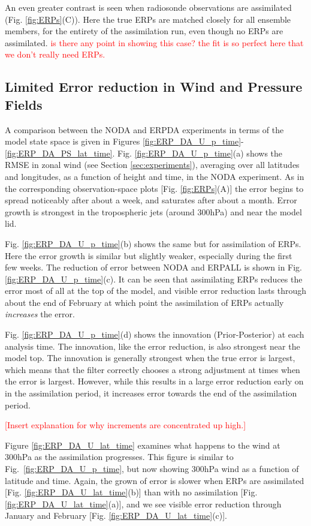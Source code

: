 \documentclass[draft,jgrga]{agutex}
\begin{document}
\begin{article}
An even greater contrast is seen when radiosonde observations are assimilated (Fig. \ref{fig:ERPs}(C)).
Here the true ERPs are matched closely for all ensemble members, for the entirety of the assimilation run, even though no ERPs are assimilated.
\textcolor{red}{is there any point in showing this case?  the fit is so perfect here that we don't really need ERPs.}

\subsection{Limited Error reduction in Wind and Pressure Fields}

A comparison between the NODA and ERPDA experiments in terms of the model state space is given in Figures \ref{fig:ERP_DA_U_p_time}-\ref{fig:ERP_DA_PS_lat_time}.
Fig. \ref{fig:ERP_DA_U_p_time}(a) shows the RMSE in zonal wind (see Section \ref{sec:experiments}), averaging over all latitudes and longitudes, as a function of height and time, in the NODA experiment.
As in the corresponding observation-space plots [Fig. \ref{fig:ERPs}(A)] the error begins to spread noticeably after about a week, and saturates after about a month.
Error growth is strongest in the tropospheric jets (around 300hPa) and near the model lid.

Fig. \ref{fig:ERP_DA_U_p_time}(b) shows the same but for assimilation of ERPs.  
Here the error growth is similar but slightly weaker, especially during the first few weeks.
The reduction of error between NODA and ERPALL is shown in Fig. \ref{fig:ERP_DA_U_p_time}(c).
It can be seen that assimilating ERPs reduces the error most of all at the top of the model, and visible error reduction lasts through about the end of February at which point the assimilation of ERPs actually \textit{increases} the error.

Fig. \ref{fig:ERP_DA_U_p_time}(d) shows the innovation (Prior-Posterior) at each analysis time.
The innovation, like the error reduction, is also strongest near the model top.
The innovation is generally strongest when the true error is largest, which means that the filter correctly chooses a strong adjustment at times when the error is largest.
However, while this results in a large error reduction early on in the assimilation period, it increases error towards the end of the assimilation period.

\textcolor{red}{[Insert explanation for why increments are concentrated up high.]}

Figure \ref{fig:ERP_DA_U_lat_time} examines what happens to the wind at 300hPa as the assimilation progresses. 
This figure is similar to Fig.~\ref{fig:ERP_DA_U_p_time}, but now showing 300hPa wind as a function of latitude and time.
Again, the grown of error is slower when ERPs are assimilated [Fig. \ref{fig:ERP_DA_U_lat_time}(b)] than with no assimilation [Fig. \ref{fig:ERP_DA_U_lat_time}(a)], and we see visible error reduction through January and February [Fig. \ref{fig:ERP_DA_U_lat_time}(c)].


\end{article}
\end{document}
